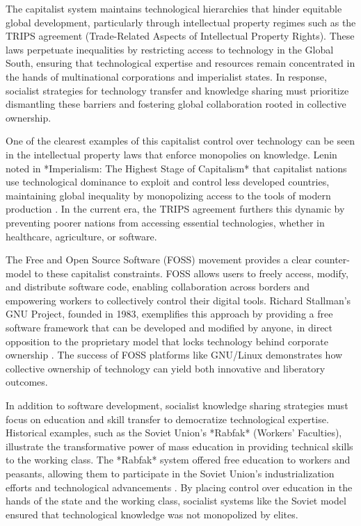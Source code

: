 \begin{refsection}
The capitalist system maintains technological hierarchies that hinder equitable global development, particularly through intellectual property regimes such as the TRIPS agreement (Trade-Related Aspects of Intellectual Property Rights). These laws perpetuate inequalities by restricting access to technology in the Global South, ensuring that technological expertise and resources remain concentrated in the hands of multinational corporations and imperialist states. In response, socialist strategies for technology transfer and knowledge sharing must prioritize dismantling these barriers and fostering global collaboration rooted in collective ownership.

One of the clearest examples of this capitalist control over technology can be seen in the intellectual property laws that enforce monopolies on knowledge. Lenin noted in *Imperialism: The Highest Stage of Capitalism* that capitalist nations use technological dominance to exploit and control less developed countries, maintaining global inequality by monopolizing access to the tools of modern production \cite[pp.~81-86]{lenin_imperialism}. In the current era, the TRIPS agreement furthers this dynamic by preventing poorer nations from accessing essential technologies, whether in healthcare, agriculture, or software.

The Free and Open Source Software (FOSS) movement provides a clear counter-model to these capitalist constraints. FOSS allows users to freely access, modify, and distribute software code, enabling collaboration across borders and empowering workers to collectively control their digital tools. Richard Stallman’s GNU Project, founded in 1983, exemplifies this approach by providing a free software framework that can be developed and modified by anyone, in direct opposition to the proprietary model that locks technology behind corporate ownership \cite[pp.~45-53]{stallman_free_software}. The success of FOSS platforms like GNU/Linux demonstrates how collective ownership of technology can yield both innovative and liberatory outcomes.

In addition to software development, socialist knowledge sharing strategies must focus on education and skill transfer to democratize technological expertise. Historical examples, such as the Soviet Union’s *Rabfak* (Workers’ Faculties), illustrate the transformative power of mass education in providing technical skills to the working class. The *Rabfak* system offered free education to workers and peasants, allowing them to participate in the Soviet Union’s industrialization efforts and technological advancements \cite[pp.~231-234]{fitzpatrick_russian_revolution}. By placing control over education in the hands of the state and the working class, socialist systems like the Soviet model ensured that technological knowledge was not monopolized by elites.


\end{refsection}
